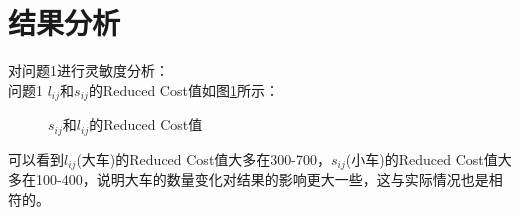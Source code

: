 \documentclass{article}
\begin{document}
	
	\section{结果分析}
	对问题1进行灵敏度分析：\\
	问题1 $l_{i j}$和$s_{i j}$的Reduced Cost值如图\ref{fig:lingmingdu}所示：\\
	\begin{figure}[htbp]
		\centering
		\quad
		\caption{ $s_{i j}$和$l_{i j}$的Reduced Cost值}
		\label{fig:lingmingdu}
	\end{figure}

    可以看到$l_{i j}$(大车)的Reduced Cost值大多在300-700，$s_{i j}$(小车)的Reduced Cost值大多在100-400，说明大车的数量变化对结果的影响更大一些，这与实际情况也是相符的。
	
	
\end{document}
